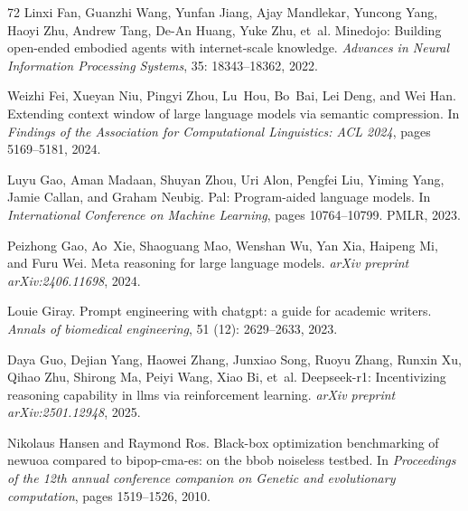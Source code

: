 \begin{thebibliography}{72}
Linxi Fan, Guanzhi Wang, Yunfan Jiang, Ajay Mandlekar, Yuncong Yang, Haoyi Zhu, Andrew Tang, De-An Huang, Yuke Zhu, et~al.
\newblock Minedojo: Building open-ended embodied agents with internet-scale knowledge.
\newblock \emph{Advances in Neural Information Processing Systems}, 35: 18343--18362, 2022.

Weizhi Fei, Xueyan Niu, Pingyi Zhou, Lu~Hou, Bo~Bai, Lei Deng, and Wei Han.
\newblock Extending context window of large language models via semantic compression.
\newblock In \emph{Findings of the Association for Computational Linguistics: ACL 2024}, pages 5169--5181, 2024.

Luyu Gao, Aman Madaan, Shuyan Zhou, Uri Alon, Pengfei Liu, Yiming Yang, Jamie Callan, and Graham Neubig.
\newblock Pal: Program-aided language models.
\newblock In \emph{International Conference on Machine Learning}, pages 10764--10799. PMLR, 2023.

Peizhong Gao, Ao~Xie, Shaoguang Mao, Wenshan Wu, Yan Xia, Haipeng Mi, and Furu Wei.
\newblock Meta reasoning for large language models.
\newblock \emph{arXiv preprint arXiv:2406.11698}, 2024.

Louie Giray.
\newblock Prompt engineering with chatgpt: a guide for academic writers.
\newblock \emph{Annals of biomedical engineering}, 51 (12): 2629--2633, 2023.

Daya Guo, Dejian Yang, Haowei Zhang, Junxiao Song, Ruoyu Zhang, Runxin Xu, Qihao Zhu, Shirong Ma, Peiyi Wang, Xiao Bi, et~al.
\newblock Deepseek-r1: Incentivizing reasoning capability in llms via reinforcement learning.
\newblock \emph{arXiv preprint arXiv:2501.12948}, 2025.

Nikolaus Hansen and Raymond Ros.
\newblock Black-box optimization benchmarking of newuoa compared to bipop-cma-es: on the bbob noiseless testbed.
\newblock In \emph{Proceedings of the 12th annual conference companion on Genetic and evolutionary computation}, pages 1519--1526, 2010.


\end{thebibliography}
